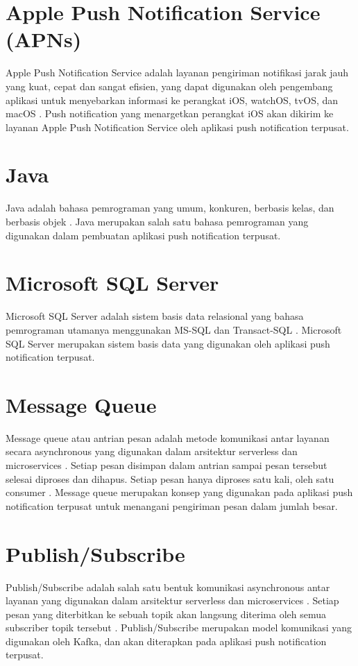 \section{Apple Push Notification Service (APNs)}
\par Apple Push Notification Service adalah layanan pengiriman notifikasi jarak jauh yang kuat, cepat dan sangat efisien, yang dapat digunakan oleh pengembang aplikasi untuk menyebarkan informasi ke perangkat iOS, watchOS, tvOS, dan macOS \cite{apns-online}. Push notification yang menargetkan perangkat iOS akan dikirim ke layanan Apple Push Notification Service oleh aplikasi push notification terpusat.

\section{Java}
\par Java adalah bahasa pemrograman yang umum, konkuren, berbasis kelas, dan berbasis objek \cite{java-online}. Java merupakan salah satu bahasa pemrograman yang digunakan dalam pembuatan aplikasi push notification terpusat.

\section{Microsoft SQL Server}
\par Microsoft SQL Server adalah sistem basis data relasional yang bahasa pemrograman utamanya menggunakan MS-SQL dan Transact-SQL \cite{sqlserver-thesis}. Microsoft SQL Server merupakan sistem basis data yang digunakan oleh aplikasi push notification terpusat.

\section{Message Queue}
\par Message queue atau antrian pesan adalah metode komunikasi antar layanan secara asynchronous yang digunakan dalam arsitektur serverless dan microservices \cite{message-queue-online}. Setiap pesan disimpan dalam antrian sampai pesan tersebut selesai diproses dan dihapus. Setiap pesan hanya diproses satu kali, oleh satu consumer \cite{message-queue-online}. Message queue merupakan konsep yang digunakan pada aplikasi push notification terpusat untuk menangani pengiriman pesan dalam jumlah besar.

\section{Publish/Subscribe}
\par Publish/Subscribe adalah salah satu bentuk komunikasi asynchronous antar layanan yang digunakan dalam arsitektur serverless dan microservices \cite{publish-subscribe-online}. Setiap pesan yang diterbitkan ke sebuah topik akan langsung diterima oleh semua subscriber topik tersebut \cite{publish-subscribe-online}. Publish/Subscribe merupakan model komunikasi yang digunakan oleh Kafka, dan akan diterapkan pada aplikasi push notification terpusat.

